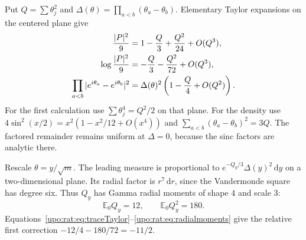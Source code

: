 \documentclass[11pt,letterpaper]{article}
\theoremstyle{remark}\newtheorem{remark}[theorem]{Remark}
\numberwithin{equation}{section}
\newcommand{\E}{\mathbb E}
\newcommand{\dd}{\,\mathrm d}
\begin{document}
Put $Q=\sum\theta_j^2$ and
$\Delta(\theta)=\prod_{a<b}(\theta_a-\theta_b)$. Elementary Taylor
expansions on the centered plane give
\begin{align}
\frac{|P|^2}{9}&=1-\frac Q3+\frac{Q^2}{24}+O(Q^3),\notag\\
\log\frac{|P|^2}{9}&=-\frac Q3-\frac{Q^2}{72}+O(Q^3),\label{upo:rat:eq:traceTaylor}\\
\prod_{a<b}|e^{i\theta_a}-e^{i\theta_b}|^2
&=\Delta(\theta)^2\left(1-\frac Q4+O(Q^2)\right).\label{upo:rat:eq:WeylTaylor}
\end{align}
For the first calculation use $\sum\theta_j^4=Q^2/2$ on that plane.
For the density use $4\sin^2(x/2)=x^2(1-x^2/12+O(x^4))$ and
$\sum_{a<b}(\theta_a-\theta_b)^2=3Q$. The factored remainder remains
uniform at $\Delta=0$, because the sinc factors are analytic there.

Rescale $\theta=y/\sqrt m$. The leading measure is proportional to
$e^{-Q_y/3}\Delta(y)^2\dd y$ on a two-dimensional plane. Its radial
factor is $r^7\dd r$, since the Vandermonde square has degree six.
Thus $Q_y$ has Gamma radial moments of shape 4 and scale 3:
\begin{equation}\label{upo:rat:eq:radialmoments}
\E_0 Q_y=12,\qquad \E_0 Q_y^2=180.
\end{equation}
Equations~\eqref{upo:rat:eq:traceTaylor}--\eqref{upo:rat:eq:radialmoments} give the
relative first correction
$-12/4-180/72=-11/2$.
\end{document}
